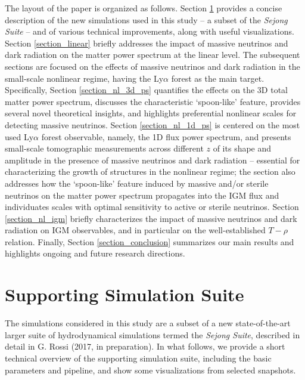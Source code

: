 \documentclass{emulateapj}
\begin{document}
The layout of the paper is organized as follows. 
Section \ref{section_simulation_suite} provides a concise description of the new simulations used in this study -- a subset of the \textit{Sejong Suite} -- and of various technical improvements, along with useful visualizations. 
Section \ref{section_linear} briefly addresses the impact of massive neutrinos and dark radiation on the matter power spectrum at the linear level. The subsequent sections are focused on the effects of massive neutrinos and dark radiation in the small-scale 
nonlinear regime, having the Ly$\alpha$ forest as the main target. 
Specifically, Section \ref{section_nl_3d_ps} quantifies the effects on the 3D total matter power spectrum, discusses the characteristic `spoon-like' feature,
provides several novel theoretical insights, and highlights preferential nonlinear scales for detecting massive neutrinos.  
Section \ref{section_nl_1d_ps} is centered on the most used Ly$\alpha$ forest observable, namely, the 1D
flux power spectrum, and presents small-scale
tomographic measurements across different $z$ of its shape and amplitude in the presence of massive neutrinos and dark radiation -- essential for characterizing the growth of structures in the nonlinear regime; 
the section also addresses  how the `spoon-like' feature induced by massive and/or sterile neutrinos on the matter power spectrum propagates into the IGM flux 
and individuates  scales with optimal 
sensitivity to active or sterile neutrinos. 
Section \ref{section_nl_igm} briefly characterizes the impact of massive neutrinos and dark radiation on IGM observables, and in particular on the well-established $T-\rho$ relation. 
Finally, Section  \ref{section_conclusion} summarizes our main results and 
highlights ongoing and future research directions.



\section{Supporting Simulation Suite} \label{section_simulation_suite}

The simulations considered in this study are a subset of a new state-of-the-art larger suite of hydrodynamical simulations termed the \textit{Sejong Suite}, described in 
detail in G. Rossi (2017, in preparation). 
In what follows,  we provide a short technical overview of the supporting simulation suite, including
the basic parameters and pipeline, and 
show some visualizations from selected snapshots.
\end{document}
